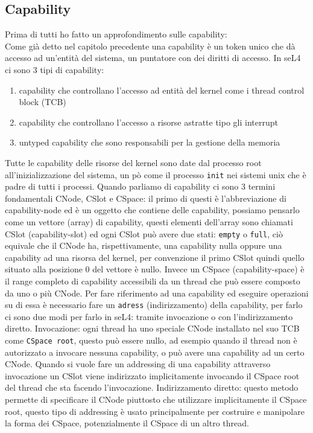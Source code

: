 \subsection{Capability}
Prima di tutti ho fatto un approfondimento sulle capability:\\
Come già detto nel capitolo precedente una capability è un token unico che dà accesso ad un'entità del sistema, un puntatore con dei diritti di accesso. In seL4 ci sono 3 tipi di capability:
\begin{enumerate}
	\item capability che controllano l'accesso ad entità del kernel come i thread control block (TCB)
	\item capability che controllano l'accesso a risorse astratte tipo gli interrupt 
	\item untyped capability che sono responsabili per la gestione della memoria
\end{enumerate}
Tutte le capability delle risorse del kernel sono date dal processo root all'inizializzazione del sistema, un pò come il processo \texttt{init} nei sistemi unix che è padre di tutti i processi. Quando parliamo di capability ci sono 3 termini fondamentali CNode, CSlot e CSpace:
il primo di questi è l'abbreviazione di capability-node ed è un oggetto che contiene delle capability, possiamo pensarlo come un vettore (array) di capability, questi elementi dell'array sono chiamati CSlot (capability-slot) ed ogni CSlot può avere due stati: \texttt{empty} o \texttt{full}, ciò equivale che il CNode ha, rispettivamente, una capability nulla oppure una capability ad una risorsa del kernel, per convenzione il primo CSlot quindi quello situato alla posizione 0 del vettore è nullo. Invece un CSpace (capability-space) è il range completo di capability accessibili da un thread che può essere composto da uno o più CNode.
Per fare riferimento ad una capability ed eseguire operazioni su di essa è necessario fare un \texttt{adress} (indirizzamento) della capability, per farlo ci sono due modi per farlo in seL4: tramite invocazione o con l'indirizzamento diretto.
Invocazione: ogni thread ha uno speciale CNode installato nel suo TCB come \texttt{CSpace root}, questo può essere nullo, ad esempio quando il thread non è autorizzato a invocare nessuna capability, o può avere una capability ad un certo CNode. Quando si vuole fare un addressing di una capability attraverso invocazione un CSlot viene indirizzato implicitamente invocando il CSpace root del thread che sta facendo l'invocazione.
Indirizzamento diretto: questo metodo permette di specificare il CNode piuttosto che utilizzare implicitamente il CSpace root, questo tipo di addressing  è usato principalmente per costruire e manipolare la forma dei CSpace, potenzialmente il CSpace di un altro thread.
